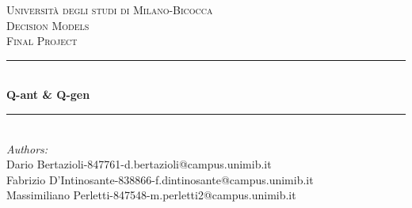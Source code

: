 \begin{titlepage}

\newcommand{\HRule}{\rule{\linewidth}{0.5mm}} %

\center %
 

\textsc{\LARGE Università degli studi di Milano-Bicocca}\\[1cm] %
\textsc{\Large Decision Models}\\[0.3cm] %
\textsc{\large Final Project}\\[0.1cm] %


\HRule \\[0.4cm]
{ \huge \bfseries Q-ant \& Q-gen}\\[0.4cm] %
\HRule \\[1.5cm]
 

\large
\emph{Authors:}\\
Dario Bertazioli-847761-d.bertazioli@campus.unimib.it \\   %
Fabrizio D'Intinosante-838866-f.dintinosante@campus.unimib.it \\
Massimiliano Perletti-847548-m.perletti2@campus.unimib.it\\[1cm] %




\end{titlepage}
